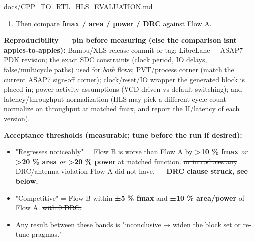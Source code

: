 \begin{relocated}{docs/CPP_TO_RTL_HLS_EVALUATION.md}
\begin{enumerate}
  \begin{itemize}
  \tightlist
  \item
    \textbf{Source→RTL equivalence:} C++ ↔ generated-RTL equivalence via
    the HLS tool\textquotesingle s own C/RTL co-simulation \emph{or}
    formal equivalence (e.g. the tool\textquotesingle s cosim harness).
    This is the check that actually validates the HLS step, and is the
    known gap flagged in the project\textquotesingle s existing
    source-to-RTL-equivalence backlog item.
  \item
    \textbf{Reference agreement:} generated RTL vs the Python reference
    model () as an independent oracle. Neither check
    substitutes for the other.
  \end{itemize}
\item
  Then compare \textbf{fmax / area / power / DRC} against Flow A.
\end{enumerate}

\textbf{Reproducibility --- pin before measuring (else the comparison
isn\textquotesingle t apples-to-apples):} Bambu/XLS release commit or
tag; LibreLane + ASAP7 PDK revision; the exact SDC constraints (clock
period, IO delays, false/\allowbreak{}multicycle paths) used for
\emph{both} flows; PVT/\allowbreak{}process corner (match the current
ASAP7 sign-off corner); clock/\allowbreak{}reset/\allowbreak{}IO wrapper
the generated block is placed in; power-activity assumptions (VCD-driven
vs default switching); and latency/\allowbreak{}throughput normalization
(HLS may pick a different cycle count --- normalize on throughput at
matched fmax, and report the II/\allowbreak{}latency of each version).

\textbf{Acceptance thresholds (measurable; tune before the run if
desired):}

\begin{itemize}
\tightlist
\item
  "Regresses noticeably" = Flow B is worse than Flow A by
  \textbf{\textgreater10 \% fmax} \emph{or} \textbf{\textgreater20 \%
  area} \emph{or} \textbf{\textgreater20 \% power} at matched function.
  \sout{\emph{or} introduces any DRC/\allowbreak{}antenna violation Flow
  A did not have.} --- \textbf{DRC clause struck, see below.}
\item
  "Competitive" = Flow B within \textbf{±5 \% fmax} and \textbf{±10 \%
  area/\allowbreak{}power} of Flow A. \sout{with 0 DRC.}
\item
  Any result between these bands is "inconclusive → widen the block set
  or re-tune pragmas."
\end{itemize}


\end{relocated}
